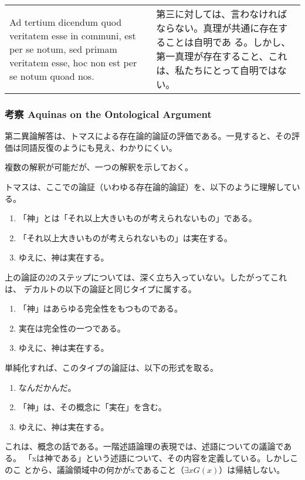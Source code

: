 \documentclass[10pt]{jsarticle} %
\begin{document}
\begin{longtable}{p{21em}p{21em}}
\\


{\sc Ad tertium dicendum} quod veritatem esse in
communi, est per se notum, sed primam veritatem esse, hoc non est per se
notum quoad nos.


&
第三に対しては、言わなければならない。真理が共通に存在することは自明であ
 る。しかし、第一真理が存在すること、これは、私たちにとって自明ではない。


\end{longtable}
\newpage
\subsubsection*{考察 Aquinas on the Ontological Argument}
第二異論解答は、トマスによる存在論的論証の評価である。一見すると、その評
価は同語反復のようにも見え、わかりにくい。

複数の解釈が可能だが、一つの解釈を示しておく。

トマスは、ここでの論証（いわゆる存在論的論証）を、以下のように理解してい
る。

\begin{enumerate}
 \item 「神」とは「それ以上大きいものが考えられないもの」である。
 \item 「それ以上大きいものが考えられないもの」は実在する。
 \item ゆえに、神は実在する。
\end{enumerate}

上の論証の2のステップについては、深く立ち入っていない。したがってこれは、
デカルトの以下の論証と同じタイプに属する。

\begin{enumerate}
 \item 「神」はあらゆる完全性をもつものである。
 \item 実在は完全性の一つである。
 \item ゆえに、神は実在する。
\end{enumerate}

単純化すれば、このタイプの論証は、以下の形式を取る。

\begin{enumerate}
 \item なんだかんだ。
 \item 「神」は、その概念に「実在」を含む。
 \item ゆえに、神は実在する。
\end{enumerate}
\noindent
これは、概念の話である。一階述語論理の表現では、述語についての議論である。
「xは神である」という述語について、その内容を定義している。しかしこのこ
とから、議論領域中の何かがxであること（$\exists xG(x)$）は帰結しない。
\end{document}
